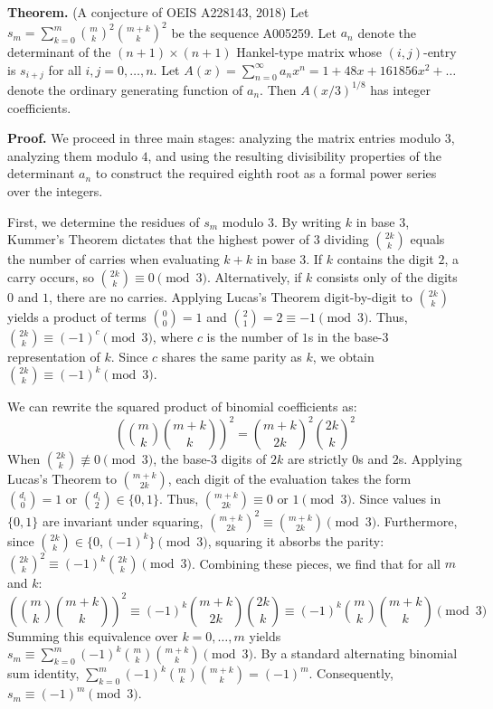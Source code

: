 \textbf{Theorem.} (A conjecture of OEIS A228143, 2018) Let $s_m = \sum_{k=0}^m \binom{m}{k}^2 \binom{m+k}{k}^2$ be the sequence A005259. Let $a_n$ denote the determinant of the $(n+1) \times (n+1)$ Hankel-type matrix whose $(i, j)$-entry is $s_{i+j}$ for all $i, j = 0, \dots, n$. Let $A(x) = \sum_{n=0}^\infty a_n x^n = 1 + 48x + 161856x^2 + \dots$ denote the ordinary generating function of $a_n$. Then $A(x/3)^{1/8}$ has integer coefficients. 

\textbf{Proof.} We proceed in three main stages: analyzing the matrix entries modulo $3$, analyzing them modulo $4$, and using the resulting divisibility properties of the determinant $a_n$ to construct the required eighth root as a formal power series over the integers.

First, we determine the residues of $s_m$ modulo $3$. By writing $k$ in base $3$, Kummer's Theorem dictates that the highest power of $3$ dividing $\binom{2k}{k}$ equals the number of carries when evaluating $k + k$ in base $3$. If $k$ contains the digit $2$, a carry occurs, so $\binom{2k}{k} \equiv 0 \pmod 3$. Alternatively, if $k$ consists only of the digits $0$ and $1$, there are no carries. Applying Lucas's Theorem digit-by-digit to $\binom{2k}{k}$ yields a product of terms $\binom{0}{0}=1$ and $\binom{2}{1}=2 \equiv -1 \pmod 3$. Thus, $\binom{2k}{k} \equiv (-1)^c \pmod 3$, where $c$ is the number of $1$s in the base-3 representation of $k$. Since $c$ shares the same parity as $k$, we obtain $\binom{2k}{k} \equiv (-1)^k \pmod 3$.

We can rewrite the squared product of binomial coefficients as:
$$ \left( \binom{m}{k} \binom{m+k}{k} \right)^2 = \binom{m+k}{2k}^2 \binom{2k}{k}^2 $$
When $\binom{2k}{k} \not\equiv 0 \pmod 3$, the base-3 digits of $2k$ are strictly $0$s and $2$s. Applying Lucas's Theorem to $\binom{m+k}{2k}$, each digit of the evaluation takes the form $\binom{d_i}{0} = 1$ or $\binom{d_i}{2} \in \{0, 1\}$. Thus, $\binom{m+k}{2k} \equiv 0 \text{ or } 1 \pmod 3$. Since values in $\{0, 1\}$ are invariant under squaring, $\binom{m+k}{2k}^2 \equiv \binom{m+k}{2k} \pmod 3$. Furthermore, since $\binom{2k}{k} \in \{0, (-1)^k\} \pmod 3$, squaring it absorbs the parity: $\binom{2k}{k}^2 \equiv (-1)^k \binom{2k}{k} \pmod 3$. Combining these pieces, we find that for all $m$ and $k$:
$$ \left( \binom{m}{k} \binom{m+k}{k} \right)^2 \equiv (-1)^k \binom{m+k}{2k} \binom{2k}{k} \equiv (-1)^k \binom{m}{k} \binom{m+k}{k} \pmod 3 $$
Summing this equivalence over $k = 0, \dots, m$ yields $s_m \equiv \sum_{k=0}^m (-1)^k \binom{m}{k} \binom{m+k}{k} \pmod 3$. By a standard alternating binomial sum identity, $\sum_{k=0}^m (-1)^k \binom{m}{k} \binom{m+k}{k} = (-1)^m$. Consequently, $s_m \equiv (-1)^m \pmod 3$. 

